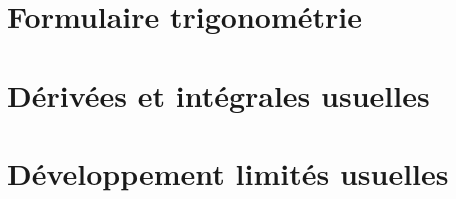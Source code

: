 \chapter{Formulaire trigonométrie}
\chapter{Dérivées et intégrales usuelles}
\chapter{Développement limités usuelles}